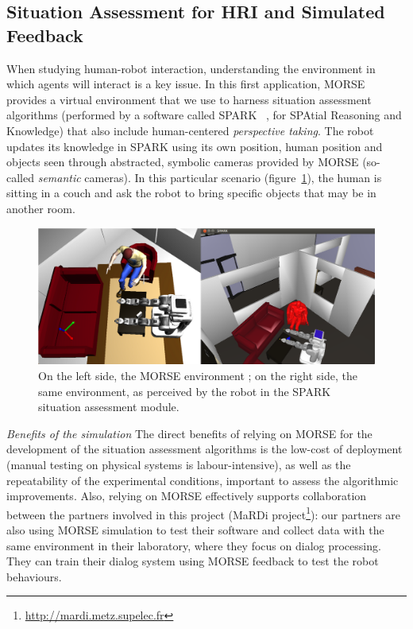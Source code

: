 \documentclass[conference]{IEEEtran}
\begin{document}
\subsection{Situation Assessment for HRI and Simulated Feedback}
\label{sc:assessment}

When studying human-robot interaction, understanding the environment in which
agents will interact is a key issue. In this first application, MORSE provides a
virtual environment that we use to harness situation assessment algorithms
(performed by a software called SPARK ~\cite{Warnier2012a}, for SPAtial Reasoning and Knowledge) that
also include human-centered \emph{perspective taking}. The robot updates its
knowledge in SPARK using its own position, human position and objects seen
through abstracted, symbolic cameras provided by MORSE (so-called
\emph{semantic} cameras). In this particular scenario (figure~\ref{fig|spark}),
the human is sitting in a couch and ask the robot to bring specific objects that
may be in another room.

\begin{figure}[H]
      \centering
      \includegraphics[width=0.9\linewidth]{morsespark.png}
      \caption{On the left side, the MORSE environment ; on the right side, the same
      environment, as perceived by the robot in the SPARK situation assessment
      module.}
      \label{fig|spark}
\end{figure}

\emph{Benefits of the simulation} The direct benefits of relying on MORSE for
the development of the situation assessment algorithms is the low-cost of
deployment (manual testing on physical systems is labour-intensive), as well as
the repeatability of the experimental conditions, important to assess the
algorithmic improvements.  Also, relying on MORSE effectively supports
collaboration between the partners involved in this project (MaRDi
project\footnote{\url{http://mardi.metz.supelec.fr}}): our partners are also
using MORSE simulation to test their software and collect data with the same
environment in their laboratory, where they focus on dialog processing. They can
train their dialog system using MORSE feedback to test the robot behaviours.
\end{document}
